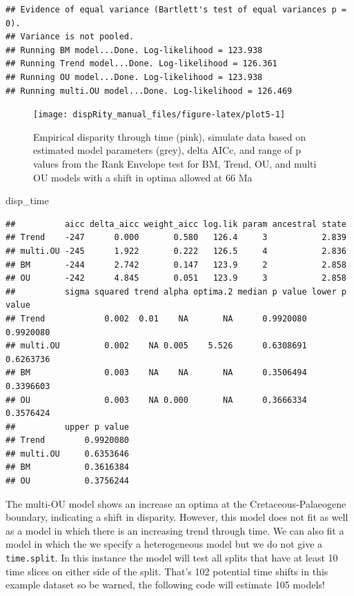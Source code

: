 \documentclass[]{book}
\newenvironment{Shaded}{\begin{snugshade}}{\end{snugshade}}
\newcommand{\NormalTok}[1]{#1}
\theoremstyle{definition}
\theoremstyle{definition}
\theoremstyle{definition}
\theoremstyle{remark}
\begin{document}
\begin{verbatim}
## Evidence of equal variance (Bartlett's test of equal variances p = 0).
## Variance is not pooled.
## Running BM model...Done. Log-likelihood = 123.938
## Running Trend model...Done. Log-likelihood = 126.361
## Running OU model...Done. Log-likelihood = 123.938
## Running multi.OU model...Done. Log-likelihood = 126.469
\end{verbatim}

\begin{figure}

{\centering \texttt{[image: dispRity\_manual\_files/figure-latex/plot5-1]} 

}

\caption{Empirical disparity through time (pink), simulate data based on estimated model parameters (grey), delta AICc, and range of p values from the Rank Envelope test for BM, Trend, OU, and multi OU models with a shift in optima allowed at 66 Ma}\label{fig:plot5}
\end{figure}

\begin{Shaded}
\begin{Highlighting}[]
\NormalTok{disp_time}
\end{Highlighting}
\end{Shaded}

\begin{verbatim}
##          aicc delta_aicc weight_aicc log.lik param ancestral state
## Trend    -247      0.000       0.580   126.4     3           2.839
## multi.OU -245      1.922       0.222   126.5     4           2.836
## BM       -244      2.742       0.147   123.9     2           2.858
## OU       -242      4.845       0.051   123.9     3           2.858
##          sigma squared trend alpha optima.2 median p value lower p value
## Trend            0.002  0.01    NA       NA      0.9920080     0.9920080
## multi.OU         0.002    NA 0.005    5.526      0.6308691     0.6263736
## BM               0.003    NA    NA       NA      0.3506494     0.3396603
## OU               0.003    NA 0.000       NA      0.3666334     0.3576424
##          upper p value
## Trend        0.9920080
## multi.OU     0.6353646
## BM           0.3616384
## OU           0.3756244
\end{verbatim}

The multi-OU model shows an increase an optima at the
Cretaceous-Palaeogene boundary, indicating a shift in disparity.
However, this model does not fit as well as a model in which there is an
increasing trend through time. We can also fit a model in which the we
specify a heterogeneous model but we do not give a \texttt{time.split}.
In this instance the model will test all splits that have at least 10
time slices on either side of the split. That's 102 potential time
shifts in this example dataset so be warned, the following code will
estimate 105 models!
\end{document}
